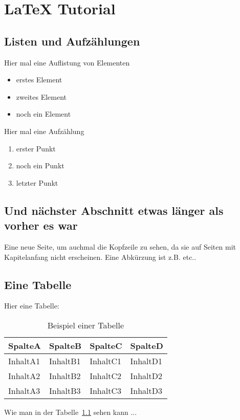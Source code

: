 \chapter{\LaTeX{} Tutorial}
\section{Listen und Aufz\"ahlungen}

Hier mal eine Auflistung von Elementen
\begin{itemize}
 \item erstes Element
 \item zweites Element
 \item noch ein Element
\end{itemize}

Hier mal eine Aufz\"ahlung
\begin{enumerate}
 \item erster Punkt
 \item noch ein Punkt
 \item letzter Punkt
\end{enumerate}

\section{Und n\"achster Abschnitt etwas l\"anger als vorher es war}
Eine neue Seite, um auchmal die Kopfzeile zu sehen, da sie auf Seiten mit Kapitelanfang nicht erscheinen. Eine Abk\"urzung ist z.B. etc..

\section{Eine Tabelle}

Hier eine Tabelle:
\begin{table}[htbp]
\centering
\begin{tabular}{l|l|l|l}
SpalteA & SpalteB & SpalteC & SpalteD \\
\midrule
InhaltA1 & InhaltB1 & InhaltC1 & InhaltD1 \\
InhaltA2 & InhaltB2 & InhaltC2 & InhaltD2 \\
InhaltA3 & InhaltB3 & InhaltC3 & InhaltD3
\end{tabular}
\caption{Beispiel einer Tabelle}
\label{tab:tabelle1}
\end{table}

Wie man in der Tabelle~\ref{tab:tabelle1} sehen kann ...

